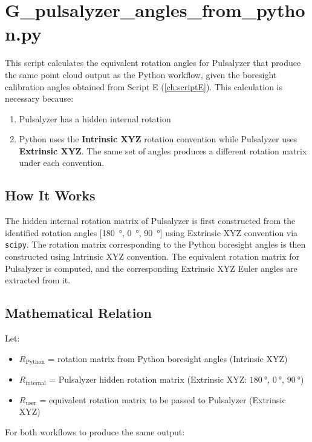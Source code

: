 \chapter{G\_pulsalyzer\_angles\_from\_python.py}

This script calculates the equivalent rotation angles for Pulsalyzer that produce the same point cloud output as the Python workflow, given the boresight calibration angles obtained from Script E (\autoref{ch:scriptE}). This calculation is necessary because:

\begin{enumerate}
    \item Pulsalyzer has a hidden internal rotation
    \item Python uses the \textbf{Intrinsic XYZ} rotation convention while Pulsalyzer uses \textbf{Extrinsic XYZ}. The same set of angles produces a different rotation matrix under each convention.
\end{enumerate}

\section{How It Works}
The hidden internal rotation matrix of Pulsalyzer is first constructed from the identified rotation angles [\qty{180}{\degree}, \qty{0}{\degree}, \qty{90}{\degree}] using Extrinsic XYZ convention via \texttt{scipy}. The rotation matrix corresponding to the Python boresight angles is then constructed using Intrinsic XYZ convention. The equivalent rotation matrix for Pulsalyzer is computed, and the corresponding Extrinsic XYZ Euler angles are extracted from it.

\section{Mathematical Relation}
Let:
\begin{itemize}
    \item $R_{\text{Python}}$ = rotation matrix from Python boresight angles (Intrinsic XYZ)
    \item $R_{\text{internal}}$ = Pulsalyzer hidden rotation matrix (Extrinsic XYZ: $\qty{180}{\degree}$, $\qty{0}{\degree}$, $\qty{90}{\degree}$)
    \item $R_{\text{user}}$ = equivalent rotation matrix to be passed to Pulsalyzer (Extrinsic XYZ)
\end{itemize}

For both workflows to produce the same output:

